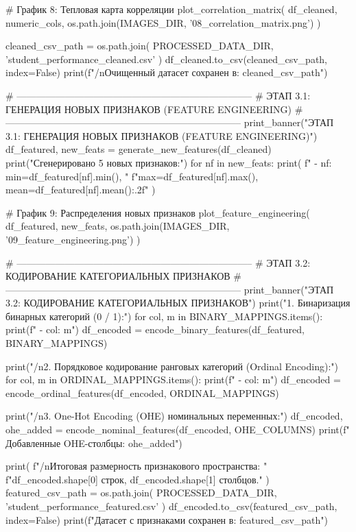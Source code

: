 \documentclass[14pt,a4paper]{extarticle}
\begin{document}
\begin{CodeListing}
    # График 8: Тепловая карта корреляции
    plot_correlation_matrix(
        df_cleaned, numeric_cols,
        os.path.join(IMAGES_DIR, '08_correlation_matrix.png')
    )

    cleaned_csv_path = os.path.join(
        PROCESSED_DATA_DIR, 'student_performance_cleaned.csv'
    )
    df_cleaned.to_csv(cleaned_csv_path, index=False)
    print(f"/nОчищенный датасет сохранен в: {cleaned_csv_path}")

    # --------------------------------------------------------------------------
    # ЭТАП 3.1: ГЕНЕРАЦИЯ НОВЫХ ПРИЗНАКОВ (FEATURE ENGINEERING)
    # --------------------------------------------------------------------------
    print_banner("ЭТАП 3.1: ГЕНЕРАЦИЯ НОВЫХ ПРИЗНАКОВ (FEATURE ENGINEERING)")
    df_featured, new_feats = generate_new_features(df_cleaned)
    print("Сгенерировано 5 новых признаков:")
    for nf in new_feats:
        print(
            f"  - {nf}: min={df_featured[nf].min()}, "
            f"max={df_featured[nf].max()}, mean={df_featured[nf].mean():.2f}"
        )

    # График 9: Распределения новых признаков
    plot_feature_engineering(
        df_featured, new_feats,
        os.path.join(IMAGES_DIR, '09_feature_engineering.png')
    )

    # --------------------------------------------------------------------------
    # ЭТАП 3.2: КОДИРОВАНИЕ КАТЕГОРИАЛЬНЫХ ПРИЗНАКОВ
    # --------------------------------------------------------------------------
    print_banner("ЭТАП 3.2: КОДИРОВАНИЕ КАТЕГОРИАЛЬНЫХ ПРИЗНАКОВ")
    print("1. Бинаризация бинарных категорий (0 / 1):")
    for col, m in BINARY_MAPPINGS.items():
        print(f"  - {col}: {m}")
    df_encoded = encode_binary_features(df_featured, BINARY_MAPPINGS)

    print("/n2. Порядковое кодирование ранговых категорий (Ordinal Encoding):")
    for col, m in ORDINAL_MAPPINGS.items():
        print(f"  - {col}: {m}")
    df_encoded = encode_ordinal_features(df_encoded, ORDINAL_MAPPINGS)

    print("/n3. One-Hot Encoding (OHE) номинальных переменных:")
    df_encoded, ohe_added = encode_nominal_features(df_encoded, OHE_COLUMNS)
    print(f"  Добавленные OHE-столбцы: {ohe_added}")

    print(
        f"/nИтоговая размерность признакового пространства: "
        f"{df_encoded.shape[0]} строк, {df_encoded.shape[1]} столбцов."
    )
    featured_csv_path = os.path.join(
        PROCESSED_DATA_DIR, 'student_performance_featured.csv'
    )
    df_encoded.to_csv(featured_csv_path, index=False)
    print(f"Датасет с признаками сохранен в: {featured_csv_path}")


\end{CodeListing}
\end{document}
